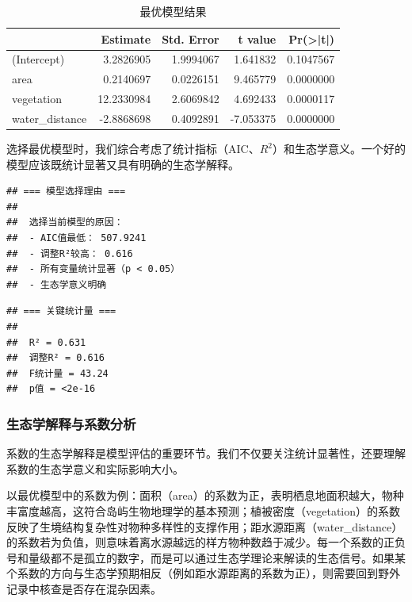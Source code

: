 \documentclass[
  twoside,12pt,fontset=none]{ctexbook}
\begin{document}
\begin{table}[!h]
\centering
\caption{\label{tab:optimal-model-results}最优模型结果}
\centering
\begin{tabular}[t]{lrrrr}
\toprule
  & Estimate & Std. Error & t value & Pr(>|t|)\\
\midrule
(Intercept) & 3.2826905 & 1.9994067 & 1.641832 & 0.1047567\\
area & 0.2140697 & 0.0226151 & 9.465779 & 0.0000000\\
vegetation & 12.2330984 & 2.6069842 & 4.692433 & 0.0000117\\
water\_distance & -2.8868698 & 0.4092891 & -7.053375 & 0.0000000\\
\bottomrule
\end{tabular}
\end{table}

选择最优模型时，我们综合考虑了统计指标（AIC、\(R^2\)）和生态学意义。一个好的模型应该既统计显著又具有明确的生态学解释。

\begin{verbatim}
## === 模型选择理由 ===
## 
##  选择当前模型的原因：
##  - AIC值最低： 507.9241 
##  - 调整R²较高： 0.616 
##  - 所有变量统计显著（p < 0.05）
##  - 生态学意义明确
\end{verbatim}

\begin{verbatim}
## === 关键统计量 ===
## 
##  R² = 0.631 
##  调整R² = 0.616 
##  F统计量 = 43.24 
##  p值 = <2e-16
\end{verbatim}

\hypertarget{ux751fux6001ux5b66ux89e3ux91caux4e0eux7cfbux6570ux5206ux6790}{%
\subsubsection{生态学解释与系数分析}\label{ux751fux6001ux5b66ux89e3ux91caux4e0eux7cfbux6570ux5206ux6790}}

系数的生态学解释是模型评估的重要环节。我们不仅要关注统计显著性，还要理解系数的生态学意义和实际影响大小。

以最优模型中的系数为例：面积（area）的系数为正，表明栖息地面积越大，物种丰富度越高，这符合岛屿生物地理学的基本预测；植被密度（vegetation）的系数反映了生境结构复杂性对物种多样性的支撑作用；距水源距离（water\_distance）的系数若为负值，则意味着离水源越远的样方物种数趋于减少。每一个系数的正负号和量级都不是孤立的数字，而是可以通过生态学理论来解读的生态信号。如果某个系数的方向与生态学预期相反（例如距水源距离的系数为正），则需要回到野外记录中核查是否存在混杂因素。
\end{document}
